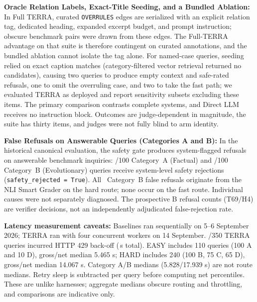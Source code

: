 \item \textbf{Oracle Relation Labels, Exact-Title Seeding, and a Bundled Ablation:} In Full TERRA, curated \texttt{OVERRULES} edges are serialized with an explicit relation tag, dedicated heading, expanded excerpt budget, and prompt instruction; obscure benchmark pairs were drawn from these edges. The Full-TERRA advantage on that suite is therefore contingent on curated annotations, and the bundled ablation cannot isolate the tag alone. For named-case queries, seeding relied on exact caption matches (category-filtered vector retrieval returned no candidates), causing two queries to produce empty context and safe-rated refusals, one to omit the overruling case, and two to take the fast path; we evaluated TERRA as deployed and report sensitivity subsets excluding these items. The primary comparison contrasts complete systems, and Direct LLM receives no instruction block. Outcomes are judge-dependent in magnitude, the suite has thirty items, and judges were not fully blind to arm identity.

\item \label{item:falserefusal}\textbf{False Refusals on Answerable Queries (Categories A and B):}
In the historical canonical evaluation, the safety gate produces system-flagged refusals on answerable benchmark inquiries: \TerraCatAFalseRefusals/100 Category~A (Factual) and \TerraCatBFalseRefusals/100 Category~B (Evolutionary) queries receive system-level safety rejections (\texttt{safety\_\allowbreak{}rejected = True}). All \TerraCatBFalseRefusals\ Category~B false refusals originate from the NLI Smart Grader on the hard route; none occur on the fast route. Individual causes were not separately diagnosed. The prospective B refusal counts (T69/H4) are verifier decisions, not an independently adjudicated false-rejection rate.

\item \textbf{Latency measurement caveats:} Baselines ran sequentially on 5--6 September 2026; TERRA ran with four concurrent workers on 14 September. \TerraThrottledRows/350 TERRA queries incurred HTTP 429 back-off (\TerraThrottleSleepSeconds\,s total). EASY includes 110 queries (100 A and 10 D), gross/net median 5.465 s; HARD includes 240 (100 B, 75 C, 65 D), gross/net median 14.067 s. Category A/B medians (5.828/17.939 s) are not route medians. Retry sleep is subtracted per query before computing net percentiles. These are unlike harnesses; aggregate medians obscure routing and throttling, and comparisons are indicative only.

